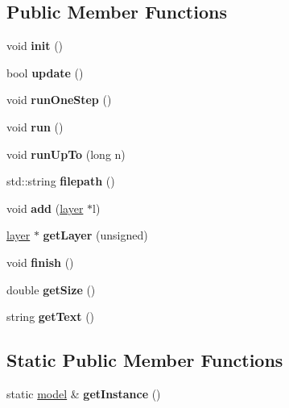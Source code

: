 \subsection*{Public Member Functions}
\begin{DoxyCompactItemize}
\item 
\mbox{\label{classmodel_abd493c0d266874a1913cccc99918ac62}} 
void {\bfseries init} ()
\item 
\mbox{\label{classmodel_a7fc3b1ce57ed26472e3bfbe10a655659}} 
bool {\bfseries update} ()
\item 
\mbox{\label{classmodel_a477cd70af36d7f510e98d26fb9f25c07}} 
void {\bfseries run\+One\+Step} ()
\item 
\mbox{\label{classmodel_a01ccb636491164b70ec3c015e12de80d}} 
void {\bfseries run} ()
\item 
\mbox{\label{classmodel_abae5132b97a5b93af153ae0756813200}} 
void {\bfseries run\+Up\+To} (long n)
\item 
\mbox{\label{classmodel_a8f54f46930b3b3af375c0cdd1abfcbba}} 
std\+::string {\bfseries filepath} ()
\item 
\mbox{\label{classmodel_a674f58eb59ee2fd722291879557b5343}} 
void {\bfseries add} (\mbox{\hyperlink{classlayer}{layer}} $\ast$l)
\item 
\mbox{\label{classmodel_a1cf467caa1e2e1cd36ce6b609d74a703}} 
\mbox{\hyperlink{classlayer}{layer}} $\ast$ {\bfseries get\+Layer} (unsigned)
\item 
\mbox{\label{classmodel_aa778b767859473ccb2b2d3268bc23d23}} 
void {\bfseries finish} ()
\item 
\mbox{\label{classmodel_a24fd9c8535250831cd798d9594e1a072}} 
double {\bfseries get\+Size} ()
\item 
\mbox{\label{classmodel_a6895d06ffc6a5447836b0ca84f544a33}} 
string {\bfseries get\+Text} ()
\end{DoxyCompactItemize}
\subsection*{Static Public Member Functions}
\begin{DoxyCompactItemize}
\item 
\mbox{\label{classmodel_a89a557ca7e1fe3ad432092b29a87b459}} 
static \mbox{\hyperlink{classmodel}{model}} \& {\bfseries get\+Instance} ()
\end{DoxyCompactItemize}
